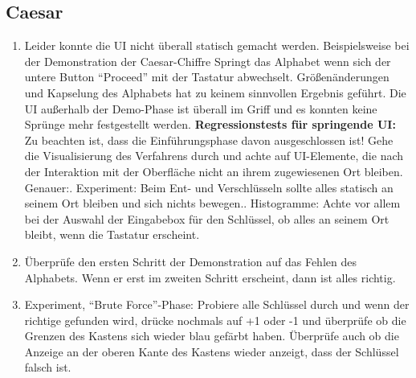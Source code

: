 \documentclass{article}
\begin{document}
 \subsection{Caesar}
  \begin{enumerate}
   \item Leider konnte die UI nicht überall statisch gemacht werden. Beispielsweise bei der Demonstration der Caesar-Chiffre 
         Springt das Alphabet wenn sich der untere Button ``Proceed'' mit der Tastatur abwechselt. Größenänderungen und Kapselung des 
         Alphabets hat zu keinem sinnvollen Ergebnis geführt. Die UI außerhalb der Demo-Phase ist überall im Griff und es konnten 
         keine Sprünge mehr festgestellt werden.\newline 
         \textbf{Regressionstests für springende UI:}\newline
         Zu beachten ist, dass die Einführungsphase davon ausgeschlossen ist!\newline
         Gehe die Visualisierung des Verfahrens durch und achte auf UI-Elemente, die nach der Interaktion mit der Oberfläche 
         nicht an ihrem zugewiesenen Ort bleiben. Genauer:. Experiment: Beim Ent- und Verschlüsseln sollte alles statisch an seinem Ort bleiben und sich nichts bewegen.. Histogramme: Achte vor allem bei der Auswahl der Eingabebox für den Schlüssel, ob alles an seinem Ort bleibt, wenn die
            Tastatur erscheint.
   \item Überprüfe den ersten Schritt der Demonstration auf das Fehlen des Alphabets. Wenn er erst im zweiten Schritt erscheint, dann ist
         alles richtig.
   \item Experiment, ``Brute Force''-Phase: Probiere alle Schlüssel durch und wenn der richtige gefunden wird, drücke nochmals auf +1 oder -1
         und überprüfe ob die Grenzen des Kastens sich wieder blau gefärbt haben. Überprüfe auch ob die Anzeige an der oberen Kante
         des Kastens wieder anzeigt, dass der Schlüssel falsch ist.     
  \end{enumerate}
  
\end{document}
